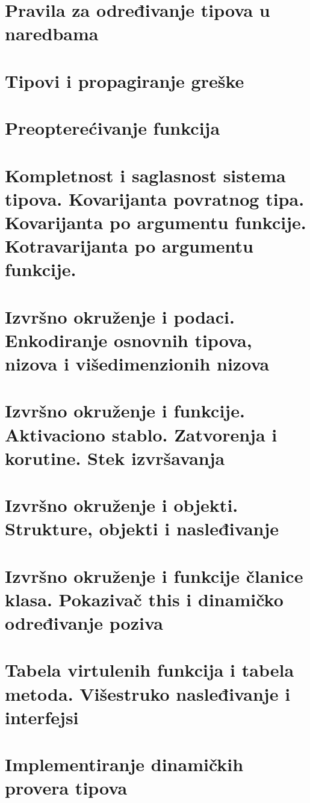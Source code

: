 \documentclass[10pt]{extarticle}
\begin{document}
\section{Pravila za određivanje tipova u naredbama}

\section{Tipovi i propagiranje greške}

\section{Preopterećivanje funkcija}

\section{Kompletnost i saglasnost sistema tipova. Kovarijanta povratnog tipa. Kovarijanta po argumentu funkcije. Kotravarijanta po argumentu funkcije.}

\section{Izvršno okruženje i podaci. Enkodiranje osnovnih tipova, nizova i višedimenzionih nizova}

\section{Izvršno okruženje i funkcije. Aktivaciono stablo. Zatvorenja i korutine. Stek izvršavanja}

\section{Izvršno okruženje i objekti. Strukture, objekti i nasleđivanje}

\section{Izvršno okruženje i funkcije članice klasa. Pokazivač this i dinamičko određivanje poziva}

\section{Tabela virtulenih funkcija i tabela metoda. Višestruko nasleđivanje i interfejsi}

\section{Implementiranje dinamičkih provera tipova}
\end{document}
